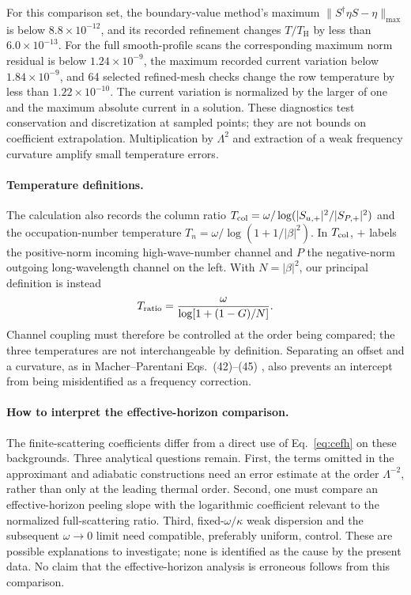 \documentclass[10pt,a4paper]{article}
\newcommand{\HawkingT}{T_{\mathrm H}}
\begin{document}
For this comparison set, the boundary-value method's maximum
$\|S^\dagger\eta S-\eta\|_{\max}$ is below $8.8\times10^{-12}$,
and its recorded refinement changes $T/\HawkingT$ by less than
$6.0\times10^{-13}$. For the full smooth-profile scans the corresponding
maximum norm residual is below $1.24\times10^{-9}$, the maximum recorded
current variation below $1.84\times10^{-9}$, and 64 selected refined-mesh
checks change the row temperature by less than $1.22\times10^{-10}$.
The current variation is normalized by the larger of one and the maximum
absolute current in a solution. These diagnostics test conservation and
discretization at sampled points; they are not bounds on coefficient
extrapolation. Multiplication by $\Lambda^2$ and extraction of a weak
frequency curvature amplify small temperature errors.

\paragraph{Temperature definitions.}
The calculation also records the column ratio
$T_{\rm col}=\omega/\log(|S_{u,+}|^2/|S_{P,+}|^2)$ and the
occupation-number temperature $T_n=\omega/\log(1+1/|\beta|^2)$. In
$T_{\rm col}$, $+$ labels the positive-norm incoming high-wave-number
channel and $P$ the negative-norm outgoing long-wavelength channel on the
left.
With $N=|\beta|^2$, our principal definition is instead
\begin{equation}
 T_{\rm ratio}=\frac{\omega}{\log[1+(1-G)/N]}.
\end{equation}
Channel coupling must therefore be controlled at the order being compared;
the three temperatures are not interchangeable by definition. Separating
an offset and a curvature, as in Macher--Parentani Eqs.~(42)--(45)
\cite{MP}, also prevents an intercept from being misidentified as a
frequency correction.

\paragraph{How to interpret the effective-horizon comparison.}
The finite-scattering coefficients differ from a direct use of
Eq.~\eqref{eq:cefh} on these backgrounds. Three analytical questions remain.
First, the terms omitted in the approximant and adiabatic constructions
\cite{DPLS25,DPLS} need an error estimate at the order $\Lambda^{-2}$, rather than only at
the leading thermal order. Second, one must compare an effective-horizon
peeling slope with the logarithmic coefficient relevant to the normalized
full-scattering ratio. Third, fixed-$\omega/\kappa$ weak dispersion and
the subsequent $\omega\to0$ limit need compatible, preferably uniform,
control. These are possible explanations to investigate; none is
identified as the cause by the present data. No claim that the
effective-horizon analysis is erroneous follows from this comparison.
\end{document}
